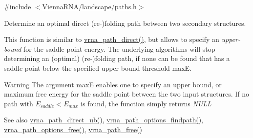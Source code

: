 {\ttfamily \#include $<$\mbox{\hyperlink{paths_8h}{Vienna\+R\+N\+A/landscape/paths.\+h}}$>$}



Determine an optimal direct (re-\/)folding path between two secondary structures. 

This function is similar to \mbox{\hyperlink{group__paths__direct_gacba096caf9a6fe134f33a5afcf2248d8}{vrna\+\_\+path\+\_\+direct()}}, but allows to specify an {\itshape upper-\/bound} for the saddle point energy. The underlying algorithms will stop determining an (optimal) (re-\/)folding path, if none can be found that has a saddle point below the specified upper-\/bound threshold {\ttfamily maxE}.

\begin{DoxyWarning}{Warning}
The argument {\ttfamily maxE} enables one to specify an upper bound, or maximum free energy for the saddle point between the two input structures. If no path with $E_{saddle} < E_{max}$ is found, the function simply returns {\itshape N\+U\+LL} 
\end{DoxyWarning}
\begin{DoxySeeAlso}{See also}
\mbox{\hyperlink{group__paths__direct_ga51d9edaeb42d1d178ea8ba46ccd4c8c0}{vrna\+\_\+path\+\_\+direct\+\_\+ub()}}, \mbox{\hyperlink{group__paths__direct_ga3790a24ca64d68acfa6e67b525151a5f}{vrna\+\_\+path\+\_\+options\+\_\+findpath()}}, \mbox{\hyperlink{group__paths_gaa64a86b13cb165346a0d0c788781512a}{vrna\+\_\+path\+\_\+options\+\_\+free()}}, \mbox{\hyperlink{group__paths_ga3763dc16760d09277a1b1c3f3061d0c7}{vrna\+\_\+path\+\_\+free()}}
\end{DoxySeeAlso}

